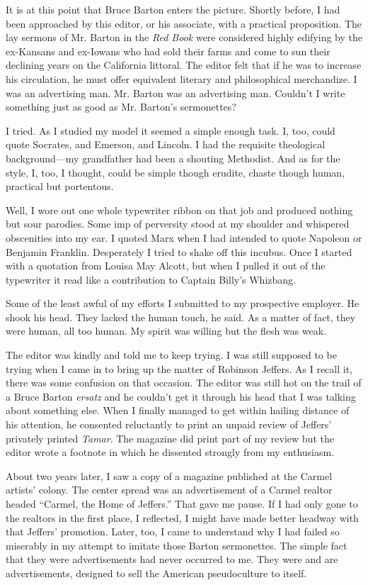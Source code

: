 \documentclass[openany,nobib]{tufte-book}
\begin{document}
\enlargethispage{\baselineskip}

It is at this point that Bruce Barton enters the picture. Shortly
before, I had been approached by this editor, or his associate, with a
practical proposition. The lay sermons of Mr. Barton in the \emph{Red
Book} were considered highly edifying by the ex-Kansans and ex-Iowans
who had sold their farms and come to sun their declining years on the
California littoral. The editor felt that if he was to increase his
circulation, he must offer equivalent literary and philosophical
merchandize. I was an advertising man. Mr. Barton was an advertising
man. Couldn't I write something just as good as Mr. Barton's
sermonettes?

I tried. As I studied my model it seemed a simple enough task. I, too,
could quote Socrates, and Emerson, and Lincoln. I had the requisite
theological background---my grandfather had been a shouting Methodist.
And as for the style, I, too, I thought, could be simple though erudite,
chaste though human, practical but portentous.

Well, I wore out one whole typewriter ribbon on that job and produced
nothing but sour parodies. Some imp of perversity stood at my shoulder
and whispered obscenities into my ear. I quoted Marx when I had intended
to quote Napoleon or Benjamin Franklin. Desperately I tried to shake off
this incubus. Once I started with a quotation from Louisa May Alcott,
but when I pulled it out of the typewriter it read like a contribution
to Captain Billy's Whizbang.

Some of the least awful of my efforts I submitted to my prospective
employer. He shook his head. They lacked the human touch, he said. As a
matter of fact, they were human, all too human. My spirit was willing
but the flesh was weak.

The editor was kindly and told me to keep trying. I was still supposed
to be trying when I came in to bring up the matter of Robinson Jeffers.
As I recall it, there was some confusion on that occasion. The editor
was still hot on the trail of a Bruce Barton \emph{ersatz} and he
couldn't get it through his head that I was talking about something
else. When I finally managed to get within hailing distance of his
attention, he consented reluctantly to print an unpaid review of
Jeffers' privately printed \emph{Tamar}. The magazine did print part of
my review but the editor wrote a footnote in which he dissented strongly
from my enthusiasm.

About two years later, I saw a copy of a magazine published at the
Carmel artists' colony. The center spread was an advertisement of a
Carmel realtor headed ``Carmel, the Home of Jeffers.'' That gave me
pause. If I had only gone to the realtors in the first place, I
reflected, I might have made better headway with that Jeffers'
promotion. Later, too, I came to understand why I had failed so
miserably in my attempt to imitate those Barton sermonettes. The simple
fact that they were advertisements had never occurred to me. They were
and are advertisements, designed to sell the American pseudoculture to
itself.
\end{document}
